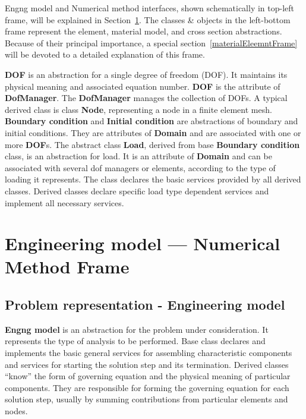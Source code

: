 \documentclass[a4paper]{article}
\newcommand{\class}[1]{{\bf #1}}
\begin{document}

Engng model and Numerical method interfaces, shown schematically in
top-left frame, will be explained in
Section~\ref{engngNummetsection}. The classes \& objects in the left-bottom frame represent the element,
material model, and cross section abstractions. Because of their
principal importance, a special 
section~\ref{materialEleemntFrame} will be devoted to a detailed
explanation of this frame. 

\class{DOF} is an abstraction for a single degree of freedom (DOF). It maintains
its physical meaning and associated equation number. \class{DOF} is
the attribute of \class{DofManager}. The \class{DofManager} manages the collection
of DOFs. A typical
derived class is class \class{Node}, representing a node in a finite element mesh.
\class{Boundary condition} and \class{Initial condition} are abstractions of boundary and
initial conditions. They are attributes of \class{Domain} and are associated
with one or more \class{DOF}s. The abstract class \class{Load}, derived from base \class{Boundary
condition} class, is an abstraction for load. It is an attribute of \class{Domain}
and can be associated with several dof managers or elements, according to
the type of loading it represents. The class declares the basic services provided by
all derived classes. Derived classes declare specific load type dependent
services and implement all necessary services.



\section {Engineering model --- Numerical Method Frame}
\label{engngNummetsection}

\subsection{Problem representation - Engineering model}
\class{Engng model} is an abstraction for the problem under
consideration. It represents the type of analysis to be performed.
Base class declares and implements the basic general services for assembling
characteristic components and services for starting the solution step and
its termination. Derived classes ``know'' the form of governing
equation and the physical meaning of  particular components. 
They are responsible for forming the governing equation for each solution
step,  usually by summing contributions from particular elements and
nodes.
\end{document}

